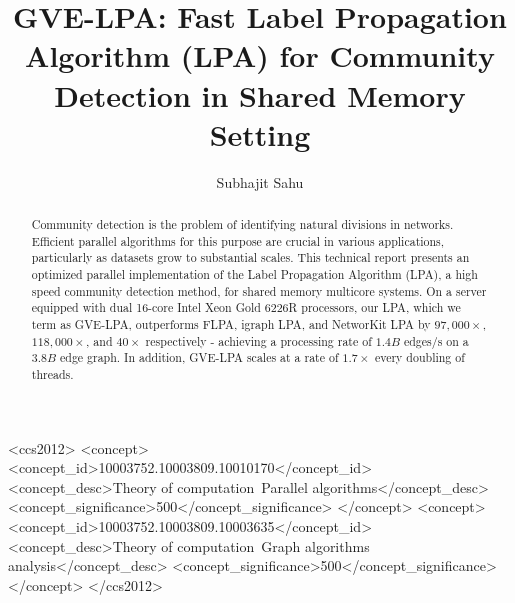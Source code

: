 \documentclass[sigconf,nonacm]{acmart}
\begin{document}
\title[GVE-LPA: Fast Label Propagation Algorithm (LPA) for Community Detection in Shared Memory Setting]{GVE-LPA: Fast Label Propagation Algorithm (LPA) for Community Detection in Shared Memory Setting}


\author{Subhajit Sahu}



\begin{abstract}
Community detection is the problem of identifying natural divisions in networks. Efficient parallel algorithms for this purpose are crucial in various applications, particularly as datasets grow to substantial scales. This technical report presents an optimized parallel implementation of the Label Propagation Algorithm (LPA), a high speed community detection method, for shared memory multicore systems. On a server equipped with dual 16-core Intel Xeon Gold 6226R processors, our LPA, which we term as GVE-LPA, outperforms FLPA, igraph LPA, and NetworKit LPA by $97,000\times$, $118,000\times$, and $40\times$ respectively - achieving a processing rate of $1.4 B$ edges/s on a $3.8 B$ edge graph. In addition, GVE-LPA scales at a rate of $1.7\times$ every doubling of threads.
\end{abstract}

\begin{CCSXML}
<ccs2012>
<concept>
<concept_id>10003752.10003809.10010170</concept_id>
<concept_desc>Theory of computation~Parallel algorithms</concept_desc>
<concept_significance>500</concept_significance>
</concept>
<concept>
<concept_id>10003752.10003809.10003635</concept_id>
<concept_desc>Theory of computation~Graph algorithms analysis</concept_desc>
<concept_significance>500</concept_significance>
</concept>
</ccs2012>
\end{CCSXML}
\end{document}
